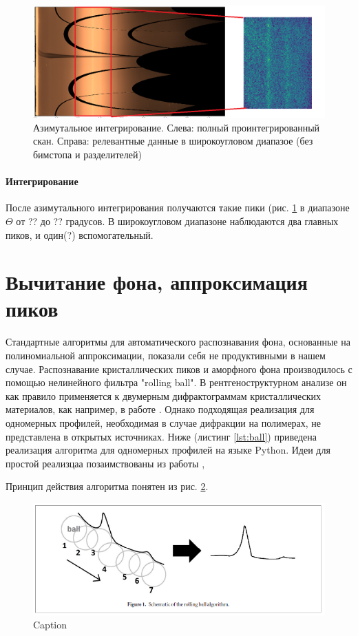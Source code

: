 \begin{figure}[t]
    \centering
    \includegraphics[width=\linewidth]{fig/azim.png}
    \caption{Азимутальное интегрирование. Слева: полный проинтегрированный скан. Справа: релевантные данные в широкоугловом диапазое (без бимстопа и разделителей)}
    \label{fig:azim}
\end{figure}	
	
	

\paragraph{Интегрирование}

После азимутального интегрирования получаются такие пики (рис. \ref{fig:azim} в диапазоне $\Theta$ от ?? до ?? градусов. 
В широкоугловом диапазоне наблюдаются два главных пиков, и один(?) вспомогательный. 




	\section{Вычитание фона, аппроксимация пиков}
	Стандартные алгоритмы для автоматического распознавания фона, основанные на полиномиальной аппроксимации, показали себя не продуктивными в нашем случае. Распознавание кристаллических пиков и аморфного фона производилось с помощью нелинейного фильтра "rolling ball". В рентгеноструктурном анализе он как правило применяется к двумерным дифрактограммам кристаллических материалов, как например, в работе \cite{ball2018}. Однако подходящая реализация для одномерных профилей, необходимая в случае дифракции на полимерах, не представлена в открытых источниках. Ниже (листинг \ref{lst:ball}) приведена реализация алгоритма для одномерных профилей на языке Python. 
	Идеи для простой реализцаа позаимствованы из работы \cite{ball-code},  
	
	Принцип действия алгоритма понятен из рис. \ref{fig:ball}. 
	
	\begin{figure}[h]
	    \centering
	    \includegraphics[width=\linewidth]{fig/ball.PNG}
	    \caption{Caption}
	    \label{fig:ball}
	\end{figure}
	  
